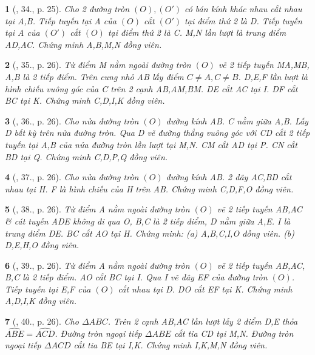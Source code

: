 \documentclass{article}
\newtheorem{baitoan}{}
\begin{document}
\begin{baitoan}[\cite{Thu_Chung_Viet_Minh_circ}, 34., p. 25]
	Cho 2 đường tròn $(O),(O')$ có bán kính khác nhau cắt nhau tại A,B. Tiếp tuyến tại A của $(O)$ cắt $(O')$ tại điểm thứ 2 là D. Tiếp tuyến tại A của $(O')$ cắt $(O)$ tại điểm thứ 2 là C. M,N lần lượt là trung điểm AD,AC. Chứng minh A,B,M,N đồng viên.
\end{baitoan}

\begin{baitoan}[\cite{Thu_Chung_Viet_Minh_circ}, 35., p. 26]
	Từ điểm M nằm ngoài đường tròn $(O)$ vẽ 2 tiếp tuyến MA,MB, A,B là 2 tiếp điểm. Trên cung nhỏ AB lấy điểm $C\ne A,C\ne B$. D,E,F lần lượt là hình chiếu vuông góc của C trên 2 cạnh AB,AM,BM. DE cắt AC tại I. DF cắt BC tại K. Chứng minh C,D,I,K đồng viên.
\end{baitoan}

\begin{baitoan}[\cite{Thu_Chung_Viet_Minh_circ}, 36., p. 26]
	Cho nửa đường tròn $(O)$ đường kính AB. C nằm giữa A,B. Lấy D bất kỳ trên nửa đường tròn. Qua D vẽ đường thẳng vuông góc với CD cắt 2 tiếp tuyến tại A,B của nửa đường tròn lần lượt tại M,N. CM cắt AD tại P. CN cắt BD tại Q. Chứng minh C,D,P,Q đồng viên.
\end{baitoan}

\begin{baitoan}[\cite{Thu_Chung_Viet_Minh_circ}, 37., p. 26]
	Cho nửa đường tròn $(O)$ đường kính AB. 2 dây AC,BD cắt nhau tại H. F là hình chiếu của H trên AB. Chứng minh C,D,F,O đồng viên.
\end{baitoan}

\begin{baitoan}[\cite{Thu_Chung_Viet_Minh_circ}, 38., p. 26]
	Từ điểm A nằm ngoài đường tròn $(O)$ vẽ 2 tiếp tuyến AB,AC \& cát tuyến ADE không đi qua O, B,C là 2 tiếp điểm, D nằm giữa A,E. I là trung điểm DE. BC cắt AO tại H. Chứng minh: (a) A,B,C,I,O đồng viên. (b) D,E,H,O đồng viên.
\end{baitoan}

\begin{baitoan}[\cite{Thu_Chung_Viet_Minh_circ}, 39., p. 26]
	Từ điểm A nằm ngoài đường tròn $(O)$ vẽ 2 tiếp tuyến AB,AC, B,C là 2 tiếp điểm. AO cắt BC tại I. Qua I vẽ dây EF của đường tròn $(O)$. Tiếp tuyến tại E,F của $(O)$ cắt nhau tại D. DO cắt EF tại K. Chứng minh A,D,I,K đồng viên.
\end{baitoan}

\begin{baitoan}[\cite{Thu_Chung_Viet_Minh_circ}, 40., p. 26]
	Cho $\Delta ABC$. Trên 2 cạnh AB,AC lần lượt lấy 2 điểm D,E thỏa $\widehat{ABE} = \widehat{ACD}$. Đường tròn ngoại tiếp $\Delta ABE$ cắt tia CD tại M,N. Đường tròn ngoại tiếp $\Delta ACD$ cắt tia BE tại I,K. Chứng minh I,K,M,N đồng viên.
\end{baitoan}
\end{document}
